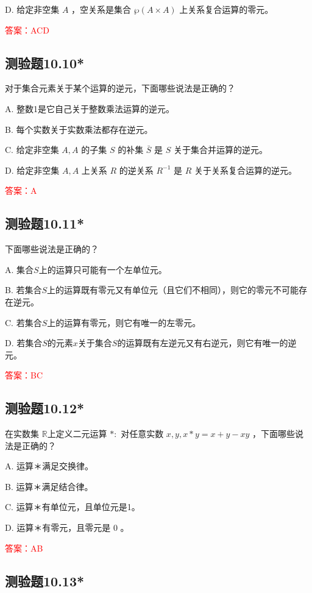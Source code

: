 \documentclass[UTF8, heading=true]{ctexart}
\begin{document}
D. 给定非空集 $A$ ，空关系是集合 $\wp(A \times A)$ 上关系复合运算的零元。

\textcolor{red}{答案：ACD}

\subsection{测验题10.10*}


对于集合元素关于某个运算的逆元，下面哪些说法是正确的？

A. 整数1是它自己关于整数乘法运算的逆元。

B. 每个实数关于实数乘法都存在逆元。

C. 给定非空集 $A, A$ 的子集 $S$ 的补集 $\bar{S}$ 是 $S$ 关于集合并运算的逆元。

D. 给定非空集 $A, A$ 上关系 $R$ 的逆关系 $R^{-1}$ 是 $R$ 关于关系复合运算的逆元。

\textcolor{red}{答案：A}

\subsection{测验题10.11*}

下面哪些说法是正确的？

A. 集合$S$上的运算只可能有一个左单位元。

B. 
若集合$S$上的运算既有零元又有单位元（且它们不相同），则它的零元不可能存在逆元。

C. 若集合$S$上的运算有零元，则它有唯一的左零元。

D. 若集合$S$的元素$x$关于集合$S$的运算既有左逆元又有右逆元，则它有唯一的逆元。

\textcolor{red}{答案：BC}


\subsection{测验题10.12*}

在实数集 $\mathbb{R}$上定义二元运算 $*:$ 对任意实数 $x, y, x * y=x+y-x y$ ，下面哪些说法是正确的？

A. 运算＊满足交换律。

B. 运算＊满足结合律。

C. 运算＊有单位元，且单位元是1。

D. 运算＊有零元，且零元是 0 。


\textcolor{red}{答案：AB}

\subsection{测验题10.13*}
\end{document}
